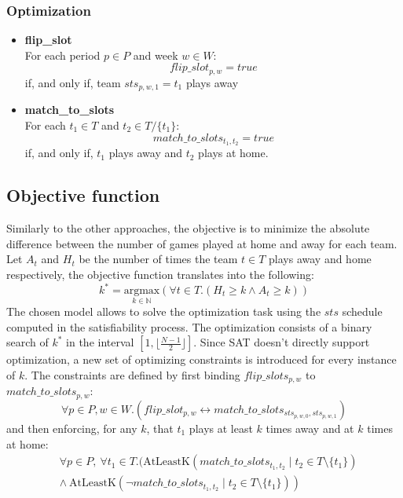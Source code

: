 \subsubsection{Optimization}
\begin{itemize}
    \item \textbf{flip\_slot}\\
        For each period $p \in P$ and week $w \in W$:
        $$
        flip\_slot_{p, w} = true
        $$
        if, and only if, team $sts_{p, w, 1} = t_1$ plays away
    \item \textbf{match\_to\_slots}\\
        For each $t_1 \in T$ and $t_2 \in T/\{t_1\}$:
        $$
        match\_to\_slots_{t_1, t_2} = true
        $$
        if, and only if, $t_1$ plays away and $t_2$ plays at home.
\end{itemize}

\subsection{Objective function}
Similarly to the other approaches, the objective is to minimize the absolute difference between the number of games played at home and away for each team.
Let $A_t$ and $H_t$ be the number of times the team $t \in T$ plays away and home respectively, the objective function translates into the following:
$$
k^* = \underset{k \in \mathbb{N}}{\text{argmax}} \left( \forall t \in T. (H_t \geq k \land A_t \geq k) \right)
$$
The chosen model allows to solve the optimization task using the $sts$ schedule computed in the satisfiability process. The optimization consists of a binary search of $k^*$ in the interval $[1, \lfloor\frac{N-1}{2}\rfloor]$. Since SAT doesn't directly support optimization, a new set of optimizing constraints is introduced for every instance of $k$. The constraints are defined by first binding $flip\_slots_{p, w}$ to $match\_to\_slots_{p, w}$:
$$
    \forall p \in P, w \in W.(flip\_slot_{p, w} \leftrightarrow match\_to\_slots_{sts_{p, w, 0}, sts_{p, w, 1}})
$$
and then enforcing, for any $k$, that $t_1$ plays at least $k$ times away and at $k$ times at home:
$$
\begin{aligned}
    &\forall p \in P,\ \forall t_1 \in T.( \text{AtLeastK}(match\_to\_slots_{t_1,t_2} \mid t_2 \in T \setminus \{t_1\})\\
    &\left. \land\ 
    \text{AtLeastK}(\lnot match\_to\_slots_{t_1,t_2} \mid t_2 \in T \setminus \{t_1\}) \right)
\end{aligned}
$$

